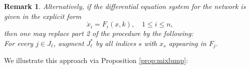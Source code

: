 \documentclass{article}
\newtheorem{remark}{Remark}
\begin{document}
\begin{remark}
    Alternatively, if the differential equation system for the network is given in the explicit form 
    \[
    \dot x_i=F_i(x,k),\quad 1\leq i\leq n,
    \]
    then one may replace part 2 of the procedure by the following: \\
For every $j\in J_\ell$, augment $J_\ell^*$ by all indices $s$ with $x_s$ appearing in $F_j$.
\end{remark}


 We illustrate this approach via Proposition \ref{prop:mixlump}:
\end{document}
